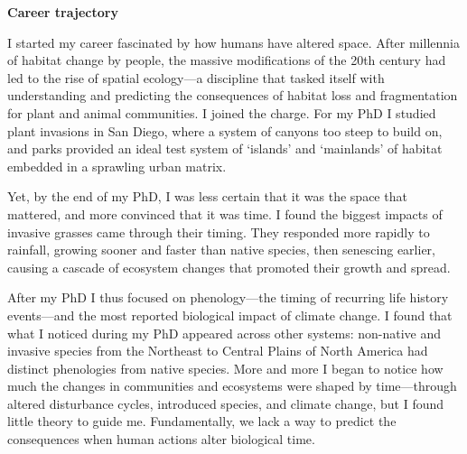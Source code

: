 \documentclass[11pt,letter,oneside]{article}
\begin{document}

\renewcommand{\refname}{\CHead{}}
\begin{centering}
{\bf Career trajectory}\\
\end{centering}
\vspace{1.5ex}
\doublespacing
I started my career fascinated by how humans have altered space. After millennia of habitat change by people, the massive modifications of the 20th century had led to the rise of spatial ecology---a discipline that tasked itself with understanding and predicting the consequences of habitat loss and fragmentation for plant and animal communities. I joined the charge. For my PhD I studied plant invasions in San Diego, where a system of canyons too steep to build on, and parks provided an ideal test system of `islands' and `mainlands' of habitat embedded in a sprawling urban matrix.

Yet, by the end of my PhD, I was less certain that it was the space that mattered, and more convinced that it was time. I found the biggest impacts of invasive grasses came through their timing. They responded more rapidly to rainfall, growing sooner and faster than native species, then senescing earlier, causing a cascade of ecosystem changes that promoted their growth and spread. 

After my PhD I thus focused on phenology---the timing of recurring life history events---and the most reported biological impact of climate change. I found that what I noticed during my PhD appeared across other systems: non-native and invasive species from the Northeast to Central Plains of North America had distinct phenologies from native species. More and more I began to notice how much the changes in communities and ecosystems were shaped by time---through altered disturbance cycles, introduced species, and climate change, but I found little theory to guide me. Fundamentally, we lack a way to predict the consequences when human actions alter biological time. 
\end{document}
